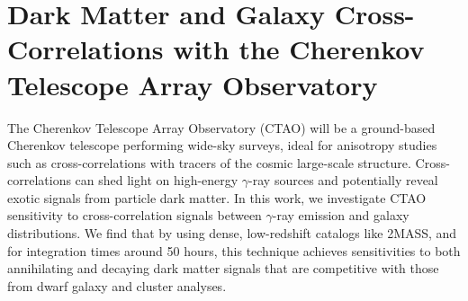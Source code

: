 %
\chapter{Dark Matter and Galaxy Cross-Correlations with the Cherenkov Telescope Array Observatory}
\label{ch:xcorr}

The Cherenkov Telescope Array Observatory (CTAO) will be a ground-based Cherenkov telescope performing wide-sky surveys, ideal for anisotropy studies such as cross-correlations with tracers of the cosmic large-scale structure. Cross-correlations can shed light on high-energy $\gamma$-ray sources and potentially reveal exotic signals from particle dark matter. In this work, we investigate CTAO sensitivity to cross-correlation signals between $\gamma$-ray emission and galaxy distributions. We find that by using dense,  low-redshift catalogs like 2MASS, and for integration times around 50 hours, this technique achieves sensitivities to both annihilating and decaying dark matter signals that are competitive with those from dwarf galaxy and cluster analyses.








\begin{subappendices}



\end{subappendices}